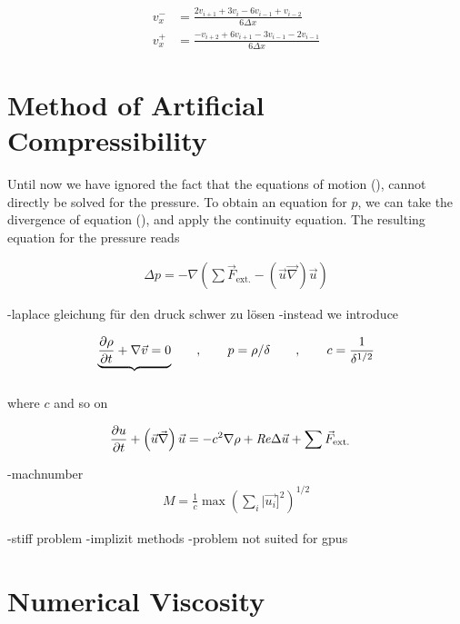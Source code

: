 \begin{align}
    v_x^- &= \frac{2v_{i+1} + 3v_i     - 6v_{i-1} + v_{i-2}}{6\Delta x}\\
    v_x^+ &= \frac{-v_{i+2} + 6v_{i+1} - 3v_{i-1} - 2v_{i-1}}{6\Delta x}
\end{align}


\newpage

\section{Method of Artificial Compressibility}

Until now we have ignored the fact that the equations of motion (), cannot directly be solved for the pressure.
To obtain an equation for $p$, we can take the divergence of equation (), and apply the continuity equation.
The resulting equation for the pressure reads

\begin{align}
    \Delta p =  -\nabla \left( \sum \vec{F}_{\text{ext.}} - (\vec{u} \vec{\nabla}) \vec{u}\right)
\end{align}

-laplace gleichung für den druck schwer zu lösen
-instead we introduce

\begin{align}
    \underbrace{\pdn[\rho]{t} +  \nabla \vec{v} = 0}_{\label{bla}} \qquad , \qquad p =\rho/\delta \qquad, \qquad c=\frac{1}{\delta^{1/2}}
\end{align}

where $c$ and so on

\begin{align}
    \label{numerik:nsac}
    \pdn[u]{t} + \left(\vec{u} \vec{\nabla}\right) \vec{u} &= -c^2\nabla\rho + \Rey \Delta \vec{u}+\sum \vec{F}_{\text{ext.}}
\end{align}

-machnumber
\begin{align}
    M = \frac{1}{c}\max\left(\sum_i |\vec{u_i}]^2\right)^{1/2}
\end{align}


-stiff problem
-implizit methods
-problem not suited for gpus
\section{Numerical Viscosity}

\begin{align}
 \label{NUMERIC:NUMVIS}
\end{align}


